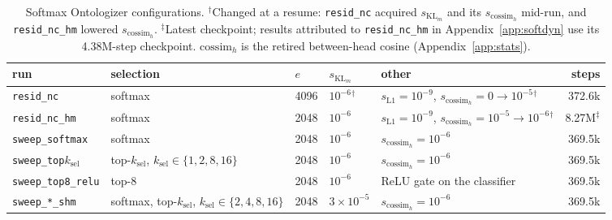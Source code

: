 \begin{table}[tp]
\vspace{8pt}
\begin{tabular}{@{}lllllr@{}}
\toprule
run & selection & $e$ & $s_{\mathrm{KL}_m}$ & other & steps \\
\midrule
\texttt{resid\_nc} & softmax & 4096 & $10^{-6}$$^\dagger$ & $s_{\mathrm{L1}}{=}10^{-9}$, $s_{\mathrm{cossim}_h}{=}0 \to 10^{-5}$$^\dagger$ & 372.6k \\
\texttt{resid\_nc\_hm} & softmax & 2048 & $10^{-6}$ & $s_{\mathrm{L1}}{=}10^{-9}$, $s_{\mathrm{cossim}_h}{=}10^{-5} \to 10^{-6}$$^\dagger$ & 8.27M$^\ddagger$ \\
\texttt{sweep\_softmax} & softmax & 2048 & $10^{-6}$ & $s_{\mathrm{cossim}_h}{=}10^{-6}$ & 369.5k \\
\texttt{sweep\_top}$k_{\mathrm{sel}}$ & top-$k_{\mathrm{sel}}$, $k_{\mathrm{sel}} \in \{1, 2, 8, 16\}$ & 2048 & $10^{-6}$ & $s_{\mathrm{cossim}_h}{=}10^{-6}$ & 369.5k \\
\texttt{sweep\_top8\_relu} & top-8 & 2048 & $10^{-6}$ & ReLU gate on the classifier & 369.5k \\
\texttt{sweep\_*\_shm} & softmax, top-$k_{\mathrm{sel}}$, $k_{\mathrm{sel}} \in \{2, 4, 8, 16\}$ & 2048 & $3\times10^{-5}$ & $s_{\mathrm{cossim}_h}{=}10^{-6}$ & 369.5k \\
\bottomrule
\end{tabular}
\caption{Softmax Ontologizer configurations. $^\dagger$Changed at a resume:
\texttt{resid\_nc} acquired $s_{\mathrm{KL}_m}$ and its $s_{\mathrm{cossim}_h}$
mid-run, and \texttt{resid\_nc\_hm} lowered $s_{\mathrm{cossim}_h}$.
$^\ddagger$Latest checkpoint; results attributed to \texttt{resid\_nc\_hm}
in Appendix~\ref{app:softdyn} use its 4.38M-step checkpoint.
$\mathrm{cossim}_h$ is the retired between-head cosine
(Appendix~\ref{app:stats}).}
\label{tab:cfg-softmax}
\end{table}
